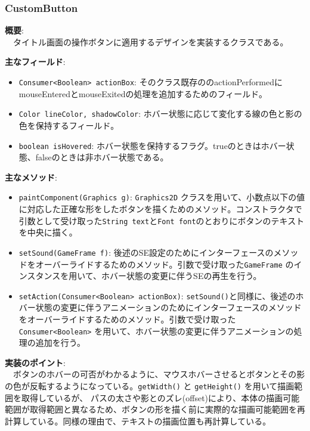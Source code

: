 \documentclass[11pt,a4j]{jarticle}
\begin{document}
\subsubsection{CustomButton}

\noindent\textbf{概要}: \\
　タイトル画面の操作ボタンに適用するデザインを実装するクラスである。

\noindent\textbf{主なフィールド}:
\begin{itemize}
    \item   \texttt{Consumer<Boolean> actionBox}: そのクラス既存ののactionPerformedにmouseEnteredとmouseExitedの処理を追加するためのフィールド。
    \item   \texttt{Color lineColor, shadowColor}: ホバー状態に応じて変化する線の色と影の色を保持するフィールド。
    \item   \texttt{boolean isHovered}: ホバー状態を保持するフラグ。trueのときはホバー状態、falseのときは非ホバー状態である。
\end{itemize}

\noindent\textbf{主なメソッド}:
\begin{itemize}
    \item \texttt{paintComponent(Graphics g)}: \texttt{Graphics2D} クラスを用いて、小数点以下の値に対応した正確な形をしたボタンを描くためのメソッド。コンストラクタで引数として受け取った\texttt{String text}と\texttt{Font font}のとおりにボタンのテキストを中央に描く。
    \item \texttt{setSound(GameFrame f)}: 後述のSE設定のためにインターフェースのメソッドをオーバーライドするためのメソッド。引数で受け取った\texttt{GameFrame} のインスタンスを用いて、ホバー状態の変更に伴うSEの再生を行う。
    \item \texttt{setAction(Consumer<Boolean> actionBox)}: \texttt{setSound()}と同様に、後述のホバー状態の変更に伴うアニメーションのためにインターフェースのメソッドをオーバーライドするためのメソッド。引数で受け取った\texttt{Consumer<Boolean>} を用いて、ホバー状態の変更に伴うアニメーションの処理の追加を行う。
\end{itemize}

\noindent\textbf{実装のポイント}: \\
　ボタンのホバーの可否がわかるように、マウスホバーさせるとボタンとその影の色が反転するようになっている。\texttt{getWidth()} と \texttt{getHeight()} を用いて描画範囲を取得しているが、
パスの太さや影とのズレ(offset)により、本体の描画可能範囲が取得範囲と異なるため、ボタンの形を描く前に実際的な描画可能範囲を再計算している。同様の理由で、テキストの描画位置も再計算している。
\end{document}
